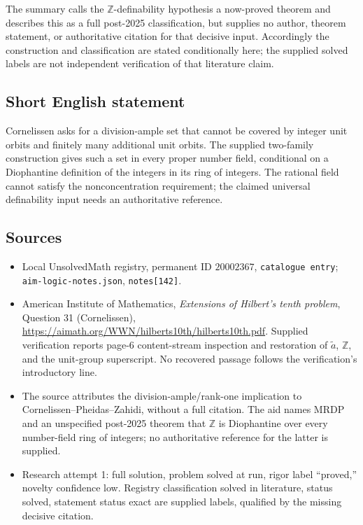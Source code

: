 \documentclass[11pt]{article}
\newcommand{\Z}{\mathbb{Z}}
\begin{document}
The summary calls the $\Z$-definability hypothesis a now-proved theorem and describes this as a full post-2025 classification, but supplies no author, theorem statement, or authoritative citation for that decisive input. Accordingly the construction and classification are stated conditionally here; the supplied solved labels are not independent verification of that literature claim.
\subsection{Short English statement}
Cornelissen asks for a division-ample set that cannot be covered by integer unit orbits and finitely many additional unit orbits. The supplied two-family construction gives such a set in every proper number field, conditional on a Diophantine definition of the integers in its ring of integers. The rational field cannot satisfy the nonconcentration requirement; the claimed universal definability input needs an authoritative reference.
\subsection{Sources}
\begin{itemize}
\item Local UnsolvedMath registry, permanent ID $20002367$, \texttt{catalogue entry}; \texttt{aim-logic-notes.json}, \texttt{notes[142]}.
\item American Institute of Mathematics, \emph{Extensions of Hilbert's tenth problem}, Question 31 (Cornelissen), \url{https://aimath.org/WWN/hilberts10th/hilberts10th.pdf}. Supplied verification reports page-6 content-stream inspection and restoration of $\widetilde a$, $\Z$, and the unit-group superscript. No recovered passage follows the verification's introductory line.
\item The source attributes the division-ample/rank-one implication to Cornelissen--Pheidas--Zahidi, without a full citation. The aid names MRDP and an unspecified post-2025 theorem that $\Z$ is Diophantine over every number-field ring of integers; no authoritative reference for the latter is supplied.
\item Research attempt 1: full solution, problem solved at run, rigor label ``proved,'' novelty confidence low. Registry classification solved in literature, status solved, statement status exact are supplied labels, qualified by the missing decisive citation.
\end{itemize}
\end{document}
